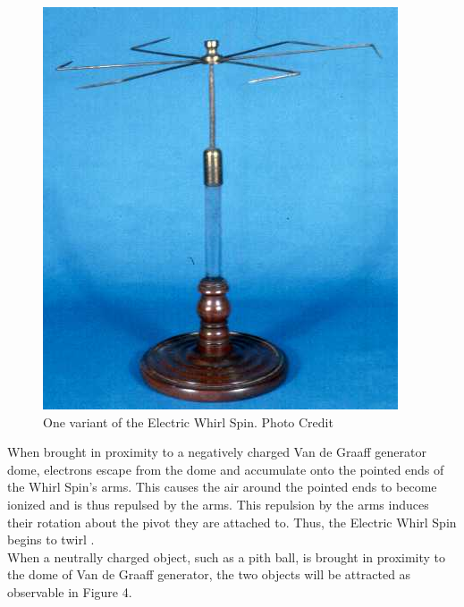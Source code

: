 \documentclass[12pt]{amsart}
\begin{document}
\begin{figure}[h]
	\includegraphics[width=\smallgraph,scale=0.01]{Whirl.png}
	\caption{One variant of the Electric Whirl Spin. Photo Credit \cite{greenslade}}
	\label{Whirl}
\end{figure}

\indent When brought in proximity to a negatively charged Van de Graaff generator dome, electrons escape from the dome and accumulate onto the pointed ends of the Whirl Spin’s arms. This causes the air around the pointed ends to become ionized and is thus repulsed by the arms. This repulsion by the arms induces their rotation about the pivot they are attached to. Thus, the Electric Whirl Spin begins to twirl \cite{davis_2012}. \\

\indent When a neutrally charged object, such as a pith ball, is brought in proximity to the dome of  Van de Graaff generator, the two objects will be attracted as observable in Figure 4.\\
\end{document}
